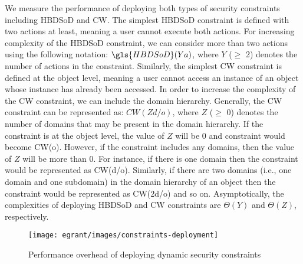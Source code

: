\documentclass[epsfig,a4paper,11pt,titlepage]{book}
\numberwithin{algorithm}{chapter}
\begin{document}
We measure the performance of deploying both types of security constraints including \gls{HBDSoD} and \gls{CW}. The simplest \gls{HBDSoD} constraint is defined with two actions at least, meaning a user cannot execute both actions. For increasing complexity of the \gls{HBDSoD} constraint, we can consider more than two actions using the following notation: $\gls{HBDSoD}(Ya)$, where $Y$ ($\geq$ 2) denotes the number of actions in the constraint. Similarly, the simplest \gls{CW} constraint is defined at the object level, meaning a user cannot access an instance of an object whose instance has already been accessed. In order to increase the complexity of the \gls{CW} constraint, we can include the domain hierarchy. Generally, the \gls{CW} constraint can be represented as: $CW(Zd/o)$, where $Z$ ($\geq$ 0) denotes the number of domains that may be present in the domain hierarchy. If the constraint is at the object level, the value of $Z$ will be 0 and constraint would become \gls{CW}(o). However, if the constraint includes any domains, then the value of $Z$ will be more than 0. For instance, if there is one domain then the constraint would be represented as \gls{CW}(d/o). Similarly, if there are two domains (i.e., one domain and one subdomain) in the domain hierarchy of an object then the constraint would be represented as \gls{CW}(2d/o) and so on. Asymptotically, the complexities of deploying \gls{HBDSoD} and \gls{CW} constraints are ${\Theta}( Y )$ and ${\Theta}( Z )$, respectively.


\begin{figure} [htp]
\centering
\texttt{[image: egrant/images/constraints-deployment]}
\caption{Performance overhead of deploying dynamic security constraints}
\label{fig:egrant-constraints-deployment}
\end{figure}
\end{document}
